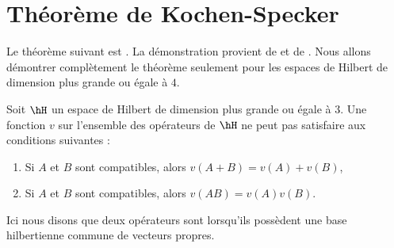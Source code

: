\section{Théorème de Kochen-Specker}

Le théorème suivant est . La démonstration provient de \cite{BainKochen} et de . Nous allons démontrer complètement le théorème seulement pour les espaces de Hilbert de dimension plus grande ou égale à \( 4\).

\begin{theorem}
    Soit \( \hH\) un espace de Hilbert de dimension plus grande ou égale à \( 3\). Une fonction \( v\) sur l'ensemble des opérateurs de \( \hH\) ne peut pas satisfaire aux conditions suivantes :
    \begin{enumerate}
        \item
            Si \( A\) et \( B\) sont compatibles, alors \( v(A+B)=v(A)+v(B)\),
        \item
            Si \( A\) et \( B\) sont compatibles, alors \( v(AB)=v(A)v(B)\).
    \end{enumerate}
    Ici nous disons que deux opérateurs sont  lorsqu'ils possèdent une base hilbertienne commune de vecteurs propres.
\end{theorem}


